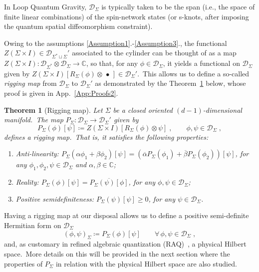 \documentclass[11pt]{article}
\newcommand{\be}{\begin{equation}}
\newcommand{\ee}{\end{equation}}
\newcommand{\cD}{\mathcal{D}}
\newtheorem{theorem}{Theorem}[section]
\theoremstyle{definition}
\numberwithin{equation}{section}
\begin{document}
\noindent
In Loop Quantum Gravity, $\cD_\Sigma$ is typically taken to be the span (i.e., the space of finite linear combinations) of the spin-network states (or s-knots, after imposing the quantum spatial diffeomorphism constraint).

Owing to the assumptions \ref{Assumption1}{\color{blue}.}-\ref{Assumption3}{\color{blue}.}, the functional $Z(\Sigma\times I)\in\mathcal D_{\Sigma^*\sqcup\Sigma}'$ associated to the cylinder can be thought of as a map $Z(\Sigma\times I):\cD_{\Sigma^*}\otimes\cD_{\Sigma}\to\mathbb C$, so that, for any $\phi\in\mathcal D_{\Sigma}$, it yields a functional on $\cD_{\Sigma}$ given by $Z(\Sigma\times I)[R_{\Sigma}(\phi)\otimes\,\bullet\,]\in\cD_{\Sigma}'$.~This allows us to define a so-called \emph{rigging map} from $\cD_{\Sigma}$ to $\cD_{\Sigma}'$ as demonstrated by the Theorem~\ref{Thm:riggingmap} below, whose proof is given in App.~\ref{App:Proofs2}.

\begin{theorem}[Rigging map]\label{Thm:riggingmap}
Let $\Sigma$ be a closed oriented $(d-1)$-dimensional manifold.~The map $P_{\Sigma}:\cD_{\Sigma}\to\cD_{\Sigma}'$ given by
\be\label{def:PSigma}
    P_{\Sigma}(\phi)[\psi]\coloneqq Z(\Sigma\times I)[R_{\Sigma}(\phi)\otimes\psi]\;,\qquad \phi,\psi\in\cD_{\Sigma}\;,
\ee
defines a rigging map.~That is, it satisfies the following properties:
\begin{enumerate}
    \item[i.]\emph{Anti-linearity:} $P_{\Sigma}(\alpha\phi_1+\beta\phi_2)[\psi]=\left(\overline{\alpha}P_{\Sigma}(\phi_1)+\overline{\beta}P_{\Sigma}(\phi_2)\right)[\psi]$, for any $\phi_1,\phi_2,\psi\in\cD_{\Sigma}$ and $\alpha,\beta\in\mathbb C$;
    \item[ii.]\emph{Reality:} $P_{\Sigma}(\phi)[\psi]=\overline{P_{\Sigma}(\psi)[\phi]}$, for any $\phi,\psi\in\cD_{\Sigma}$;
    \item[iii.]\emph{Positive semidefiniteness:} $P_{\Sigma}(\psi)[\psi]\geq0$, for any $\psi\in\cD_{\Sigma}$.
\end{enumerate}
\end{theorem}

\noindent
Having a rigging map at our disposal allows us to define a positive semi-definite Hermitian form on $\cD_{\Sigma}$
\be\label{eq:prodphys}
(\phi,\psi)_{\Sigma}\coloneqq P_{\Sigma}(\phi)[\psi]\qquad\forall\,\phi,\psi\in\cD_{\Sigma}\;,
\ee
and, as customary in refined algebraic quantization (RAQ)~\cite{Giulini_Marolf_1999a,Giulini_Marolf_1999b,Thiemann_2007}, a physical Hilbert space.~More details on this will be provided in the next section where the properties of $P_{\Sigma}$ in relation with the physical Hilbert space are also studied.
\end{document}
